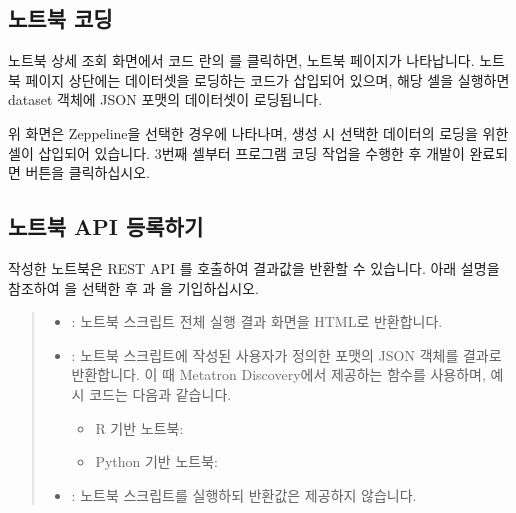 \documentclass[letterpaper,10pt,english]{sphinxmanual}
\begin{document}
\subsection{노트북 코딩}
\label{\detokenize{discovery/part05/use_a_notebook:id3}}
노트북 상세 조회 화면에서 코드 란의 를 클릭하면, 노트북 페이지가 나타납니다. 노트북 페이지 상단에는 데이터셋을 로딩하는 코드가 삽입되어 있으며, 해당 셀을 실행하면 dataset 객체에 JSON 포맷의 데이터셋이 로딩됩니다.
\begin{quote}

\begin{figure}[H]
\centering

\noindent{}
\end{figure}
\end{quote}

위 화면은 Zeppeline을 선택한 경우에 나타나며, 생성 시 선택한 데이터의 로딩을 위한 셀이 삽입되어 있습니다. 3번째 셀부터 프로그램 코딩 작업을 수행한 후 개발이 완료되면  버튼을 클릭하십시오.


\subsection{노트북 API 등록하기}
\label{\detokenize{discovery/part05/use_a_notebook:api}}
작성한 노트북은 REST API 를 호출하여 결과값을 반환할 수 있습니다. 아래 설명을 참조하여 을 선택한 후 과 을 기입하십시오.
\begin{quote}

\begin{figure}[H]
\centering

\noindent{}
\end{figure}
\begin{itemize}
\item {} 
: 노트북 스크립트 전체 실행 결과 화면을 HTML로 반환합니다.

\item {} 
: 노트북 스크립트에 작성된 사용자가 정의한 포맷의 JSON 객체를 결과로 반환합니다. 이 때 Metatron Discovery에서 제공하는  함수를 사용하며, 예시 코드는 다음과 같습니다.
\begin{itemize}
\item {} 
R 기반 노트북: 

\item {} 
Python 기반 노트북: 

\end{itemize}

\item {} 
: 노트북 스크립트를 실행하되 반환값은 제공하지 않습니다.

\end{itemize}
\end{quote}
\end{document}
